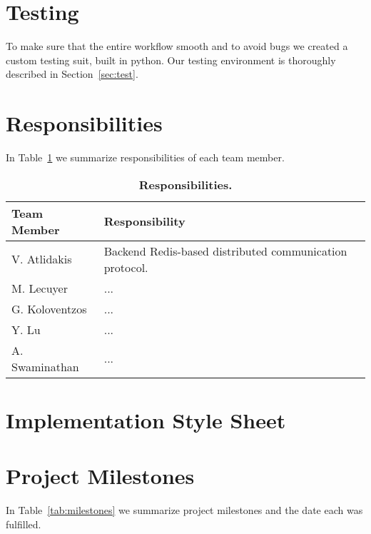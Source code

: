 \section{Testing}
To make sure that the entire workflow smooth and to avoid bugs we created a
custom testing suit, built in python. Our testing environment is thoroughly
described in Section~\ref{sec:test}.


\section{Responsibilities}
In Table~\ref{tab:resp} we summarize responsibilities of each team member.
\begin{table}[!h]
{
 \begin{center}
    \begin{tabular}{ | l || l |}
    \hline
    \textbf{Team Member} & \textbf{Responsibility} \\
    \hline
    \hline
    V. Atlidakis & Backend Redis-based distributed communication protocol.\\ \hline
    M. Lecuyer & ... \\ \hline
    G. Koloventzos & ... \\ \hline
    Y. Lu & ...  \\ \hline
    A. Swaminathan  &  ... \\ \hline
    \hline
    \end{tabular}
    \caption{\textbf{Responsibilities.}}
    \label{tab:resp}
 \end{center}
}
\end{table}

\section{Implementation Style Sheet}



\section{Project Milestones}
In Table~\ref{tab:milestones}  we summarize project milestones and the date
each was fulfilled.

